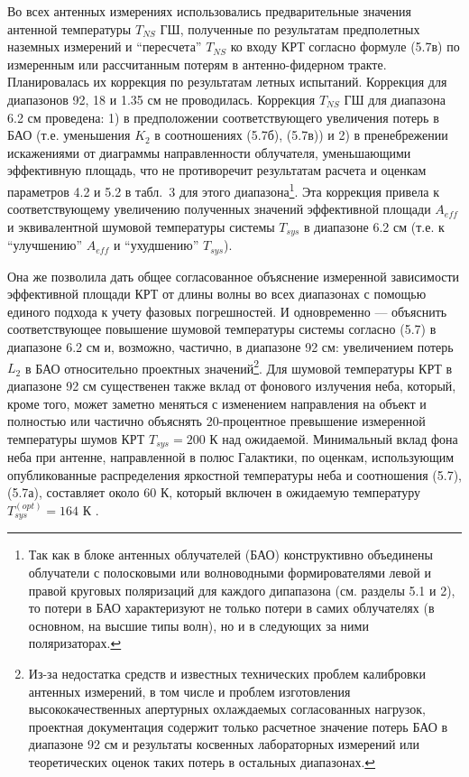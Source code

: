 Во всех антенных измерениях использовались предварительные значения антенной
температуры $T_{NS}$ ГШ, полученные по результатам предполетных наземных измерений
и ``пересчета'' $T_{NS}$ ко входу КРТ согласно формуле (5.7в)
по измеренным или рассчитанным потерям  \cite{}
в антенно-фидерном тракте.
Планировалась их коррекция по результатам летных испытаний.
Коррекция для диапазонов 92, 18 и 1.35 см не проводилась.
Коррекция $T_{NS}$ ГШ для диапазона 6.2 см проведена:
1) в предположении соответствующего увеличения потерь в БАО
(т.е. уменьшения $K_2$ в соотношениях (5.7б), (5.7в)) и
2) в пренебрежении искажениями от
диаграммы направленности облучателя, уменьшающими эффективную площадь,
что не противоречит результатам расчета  \cite{}
и оценкам параметров
4.2 и 5.2 в табл.~3 для этого диапазона\footnote
{Так как в блоке антенных облучателей (БАО) конструктивно объединены
облучатели с полосковыми или волноводными формирователями
левой и правой круговых поляризаций для каждого дипапазона
(см. разделы 5.1 и  2), то потери в БАО характеризуют
не только потери в самих облучателях (в основном, на высшие типы волн), но
и в следующих за ними поляризаторах.
}.
Эта коррекция привела к соответствующему увеличению полученных значений
эффективной площади $A_{eff}$ и эквивалентной шумовой температуры системы
$T_{sys}$ в диапазоне 6.2 см (т.е. к ``улучшению'' $A_{eff}$ и ``ухудшению''
$T_{sys}$).


Она же  позволила дать общее согласованное объяснение измеренной
зависимости эффективной площади КРТ от длины волны во всех диапазонах с
помощью единого подхода к учету фазовых погрешностей. И одновременно ---
объяснить соответствующее повышение шумовой температуры системы согласно
(5.7)  в диапазоне 6.2 см и, возможно, частично, в диапазоне
92 см: увеличением потерь $L_2$ в БАО относительно проектных значений\footnote
{Из-за недостатка средств  и известных технических проблем калибровки
антенных измерений, в том числе и проблем
изготовления высококачественных апертурных охлаждаемых согласованных нагрузок,
проектная документация содержит только расчетное значение потерь БАО в
диапазоне 92 см и результаты косвенных лабораторных измерений  или теоретических
оценок таких потерь в остальных диапазонах.}. Для шумовой температуры КРТ
в диапазоне 92 см существенен также вклад от фонового излучения неба,
который, кроме того, может заметно меняться с изменением направления на
объект и полностью или частично объяснять 20-процентное превышение
измеренной температуры шумов КРТ $T_{sys} = 200$ К над ожидаемой.
Минимальный вклад фона неба при антенне, направленной в полюс Галактики,
по оценкам, использующим опубликованные распределения яркостной
температуры неба и соотношения (5.7), (5.7а), составляет около 60 К,
который включен в ожидаемую температуру $T_{sys}^{(opt)} = 164 $ К
 \cite{}.

